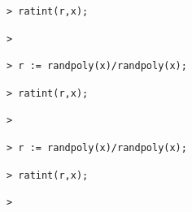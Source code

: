 \documentclass{article}
\begin{document}
\begin{lstlisting}
> ratint(r,x);
\end{lstlisting}
\begin{lstlisting}
> 
\end{lstlisting}
\begin{lstlisting}
> r := randpoly(x)/randpoly(x);
\end{lstlisting}
\begin{lstlisting}
> ratint(r,x);
\end{lstlisting}
\begin{lstlisting}
> 
\end{lstlisting}
\begin{lstlisting}
> r := randpoly(x)/randpoly(x);
\end{lstlisting}
\begin{lstlisting}
> ratint(r,x);
\end{lstlisting}
\begin{lstlisting}
> 
\end{lstlisting}
\end{document}
